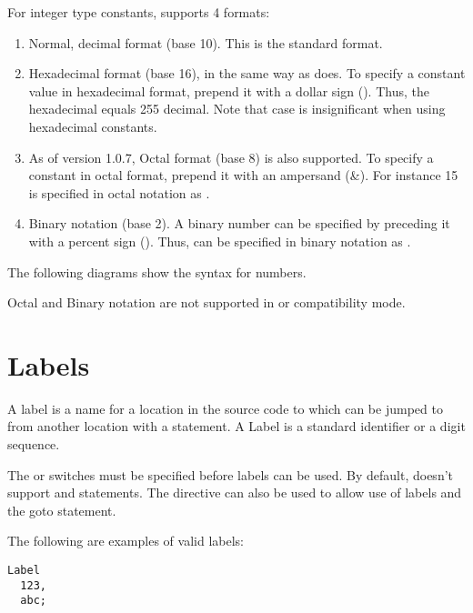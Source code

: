 For integer type constants, \fpc supports 4 formats:
\begin{enumerate}
\item Normal, decimal format (base 10). This is the standard
format.
\item Hexadecimal format (base 16), in the same way as \tp does.
To specify a constant value in hexadecimal format, prepend it with a dollar
sign (\var{\$}). Thus, the hexadecimal  equals 255 decimal.
Note that case is insignificant when using hexadecimal constants.
\item As of version 1.0.7, Octal format (base 8) is also supported.
To specify a constant in octal format, prepend it with an ampersand (\&).
For instance 15 is specified in octal notation as
.
\item Binary notation (base 2). A binary number can be specified
by preceding it with a percent sign (\var{\%}). Thus,  can be
specified in binary notation as .
\end{enumerate}
The following diagrams show the syntax for numbers.



\begin{remark}
Octal and Binary notation are not supported in  or  
compatibility mode.
\end{remark}

\section{Labels}
 
A label is a name for a location in the source code to which can be 
jumped to from another location with a  statement. A Label is a
standard identifier or a digit sequence.

\begin{remark}
The  or  switches must be specified before 
labels can be used. By default, \fpc doesn't support  and 
 statements. The  directive can also be used
to allow use of labels and the goto statement.
\end{remark}
The following are examples of valid labels:
\begin{verbatim}
Label
  123,
  abc;
\end{verbatim}
